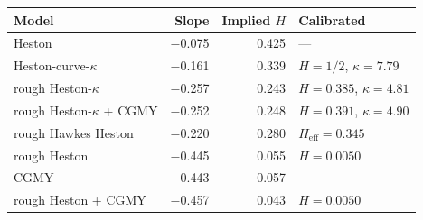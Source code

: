 \begin{tabular}{lrrl}
\toprule
Model & Slope & Implied $H$ & Calibrated\\
\midrule
Heston & $-$0.075 & 0.425 & ---\\
Heston-curve-$\kappa$ & $-$0.161 & 0.339 & $H = 1/2$, $\kappa = 7.79$\\
rough Heston-$\kappa$ & $-$0.257 & 0.243 & $H = 0.385$, $\kappa = 4.81$\\
rough Heston-$\kappa$ + CGMY & $-$0.252 & 0.248 & $H = 0.391$, $\kappa = 4.90$\\
rough Hawkes Heston & $-$0.220 & 0.280 & $H_{\mathrm{eff}} = 0.345$\\
\midrule
rough Heston & $-$0.445 & 0.055 & $H = 0.0050$\\
CGMY & $-$0.443 & 0.057 & ---\\
rough Heston + CGMY & $-$0.457 & 0.043 & $H = 0.0050$\\
\bottomrule
\end{tabular}
